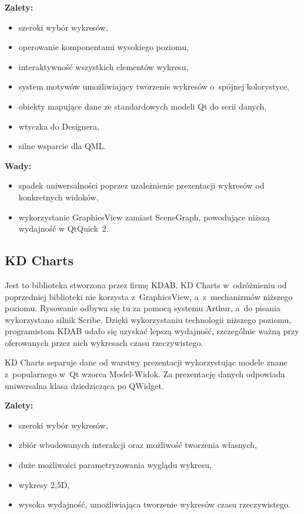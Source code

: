 \textbf{Zalety:}
\begin{itemize}
\item{szeroki wybór wykresów,}
\item{operowanie komponentami wysokiego poziomu,}
\item{interaktywność wszystkich elementów wykresu,}
\item{system motywów umożliwiający tworzenie wykresów o~spójnej kolorystyce,}
\item{obiekty mapujące dane ze standardowych modeli Qt do serii danych,}
\item{wtyczka do Designera,}
\item{silne wsparcie dla QML.}\newline
\end{itemize}

\textbf{Wady:}
\begin{itemize}
\item{spadek uniwersalności poprzez uzależnienie prezentacji wykresów od konkretnych widoków,}
\item{wykorzystanie GraphicsView zamiast SceneGraph, powodujące niższą wydajność w QtQuick~2.}
\end{itemize}


\subsection{KD Charts}
Jest to biblioteka stworzona przez firmę KDAB. KD Charts w~odróżnieniu od poprzedniej biblioteki nie korzysta z~GraphicsView, a~z~mechanizmów niższego poziomu. Rysowanie odbywa się tu za pomocą systemu Arthur, a~do pisania wykorzystano silnik Scribe.
Dzięki wykorzystaniu technologii niższego poziomu, programistom KDAB udało się uzyskać lepszą wydajność, szczególnie ważną przy oferowanych przez nich wykresach czasu rzeczywistego.\newline

KD Charts separuje dane od warstwy prezentacji wykorzystując modele znane z~popularnego w~Qt wzorca Model-Widok. Za prezentację danych odpowiada uniwersalna klasa dziedzicząca po QWidget.\newline

\textbf{Zalety:}
\begin{itemize}
\item{szeroki wybór wykresów,}
\item{zbiór wbudowanych interakcji oraz możliwość tworzenia własnych,}
\item{duże możliwości parametryzowania wyglądu wykresu,}
\item{wykresy 2,5D,}
\item{wysoka wydajność, umożliwiająca tworzenie wykresów czasu rzeczywistego.}\newline
\end{itemize}


